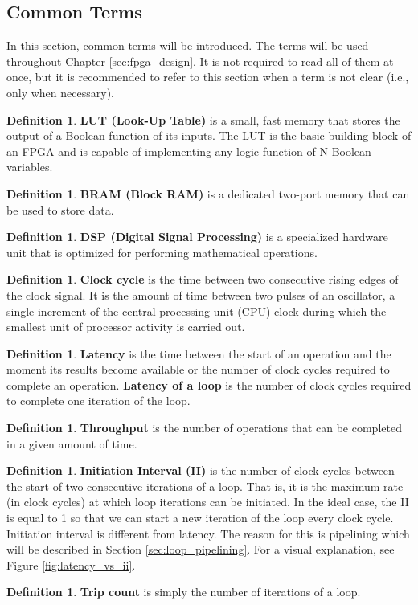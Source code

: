 \documentclass[a4paper, twoside]{report}
\theoremstyle{definition}
\newtheorem{definition}[theorem]{Definition}
\numberwithin{equation}{section}
\begin{document}
\subsection{Common Terms}

In this section, common terms will be introduced.
The terms will be used throughout Chapter \ref{sec:fpga_design}.
It is not required to read all of them at once, but it is recommended to refer to this section
when a term is not clear (i.e., only when necessary).

\begin{definition}
    \textbf{LUT (Look-Up Table)} is a small, fast memory that stores the output of a Boolean function of its inputs.
    The LUT is the basic building block of an FPGA and is capable of implementing any logic function of N Boolean variables.
\end{definition}
\begin{definition}
    \textbf{BRAM (Block RAM)} is a dedicated two-port memory that can be used to store data.
\end{definition}
\begin{definition}
    \textbf{DSP (Digital Signal Processing)} is a specialized hardware unit that is optimized for performing mathematical operations.
\end{definition}
\begin{definition}
    \textbf{Clock cycle} is the time between two consecutive rising edges of the clock signal.
    It is the amount of time between two pulses of an oscillator, a single increment of the
    central processing unit (CPU) clock during which the smallest unit of processor activity
    is carried out.
\end{definition}
\begin{definition}
    \textbf{Latency} is the time between the start of an operation and the moment its results become available
    or the number of clock cycles required to complete an operation.
    \textbf{Latency of a loop} is the number of clock cycles required to complete one iteration of the loop.
\end{definition}
\begin{definition}
    \textbf{Throughput} is the number of operations that can be completed in a given amount of time.
\end{definition}
\begin{definition}
    \textbf{Initiation Interval (II)} is the number of clock cycles between the start of two consecutive iterations of a loop.
    That is, it is the maximum rate (in clock cycles) at which loop iterations can be initiated.
    In the ideal case, the II is equal to 1 so that we can start a new iteration of the loop every clock cycle.
    Initiation interval is different from latency.
    The reason for this is pipelining which will be described in Section \ref{sec:loop_pipelining}.
    For a visual explanation, see Figure \ref{fig:latency_vs_ii}.
\end{definition}
\begin{definition}
    \textbf{Trip count} is simply the number of iterations of a loop.
\end{definition}
\end{document}
